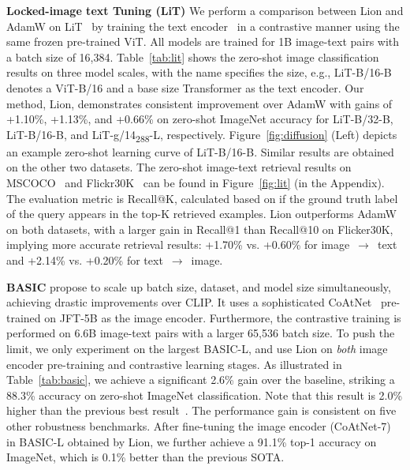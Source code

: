 \documentclass{article}
\newcommand{\name}{Lion}
\begin{document}
\textbf{Locked-image text Tuning (LiT)}
We perform a comparison between \name{} and AdamW on LiT~\citep{zhai2022lit} by training the text encoder~\citep{zhai2022lit} in a contrastive manner using the same frozen pre-trained ViT.
All models are trained for 1B image-text pairs with a batch size of 16,384. Table~\ref{tab:lit} shows the zero-shot image classification results on three model scales, with the name specifies the size, e.g., LiT-B/16-B denotes a ViT-B/16 and a base size Transformer as the text encoder. 
Our method, \name{}, demonstrates consistent improvement over AdamW with gains of +1.10\%, +1.13\%, and +0.66\%
on zero-shot ImageNet accuracy for LiT-B/32-B, LiT-B/16-B, and LiT-g/14\textsubscript{288}-L, respectively. Figure~\ref{fig:diffusion} (Left) depicts an example zero-shot learning curve of LiT-B/16-B. Similar results are obtained on the other two datasets.
The zero-shot image-text retrieval results on MSCOCO~\citep{lin2014coco} and Flickr30K~\citep{plummer2015flickr} can be found in Figure~\ref{fig:lit} (in the Appendix).
The evaluation metric is Recall@K, calculated based on if the ground truth label of the query appears in the top-K retrieved examples. 
\name{} outperforms AdamW on both datasets, with a larger gain in Recall@1 than Recall@10 on Flicker30K, implying more accurate retrieval results: +1.70\% vs. +0.60\% for image~$\rightarrow$~text and +2.14\% vs. +0.20\% for text~$\rightarrow$~image.




\textbf{BASIC}
\citet{hieu2021basic} propose to scale up batch size, dataset, and model size simultaneously, achieving drastic improvements over CLIP.
It uses a sophisticated CoAtNet~\citep{dai2021coatnet} pre-trained on JFT-5B as the image encoder.
Furthermore, the contrastive training is performed on 6.6B image-text pairs with a larger 65,536 batch size.
To push the limit, we only experiment on the largest BASIC-L, and use \name{} on \textit{both} image encoder pre-training and contrastive learning stages.
As illustrated in Table~\ref{tab:basic}, we achieve a significant 2.6\% gain over the baseline, striking a 88.3\% accuracy on zero-shot ImageNet classification. Note that this result is 2.0\% higher than the previous best result~\citep{yu2022coca}.
The performance gain is consistent on five other robustness benchmarks.
After fine-tuning the image encoder (CoAtNet-7) in BASIC-L obtained by \name{}, we further achieve a 91.1\% top-1 accuracy on ImageNet, which is 0.1\% better than the previous SOTA.


\end{document}
